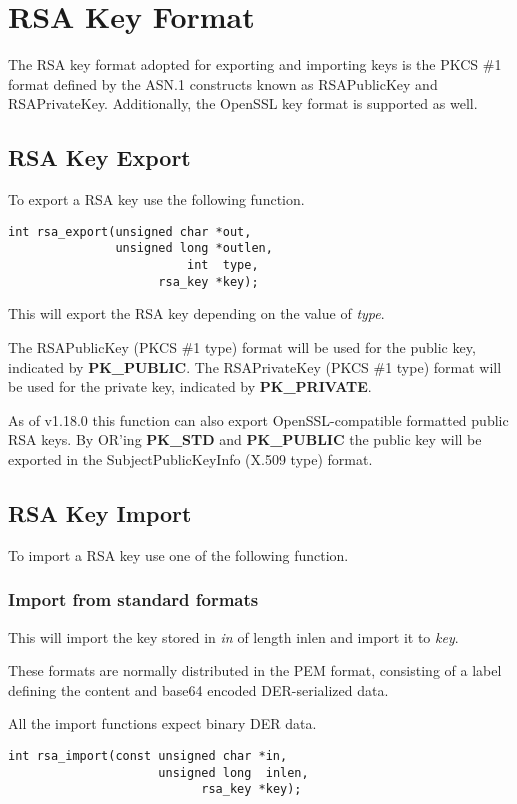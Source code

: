 \documentclass[synpaper]{book}
\newcommand{\mysection}[1]    %
	{                   %
	\section{#1}
   \markboth{\textsf{www.libtom.net}}{\thesection ~ {#1}}
	}
\begin{document}
\mysection{RSA Key Format}

The RSA key format adopted for exporting and importing keys is the PKCS \#1 format defined by the ASN.1 constructs known as
RSAPublicKey and RSAPrivateKey.  Additionally, the OpenSSL key format is supported as well.

\subsection{RSA Key Export}
To export a RSA key use the following function.

\begin{verbatim}
int rsa_export(unsigned char *out,
               unsigned long *outlen,
                         int  type,
                     rsa_key *key);
\end{verbatim}

This will export the RSA key depending on the value of \textit{type}.

The RSAPublicKey (PKCS \#1 type) format will be used for the public key,
indicated by \textbf{PK\_PUBLIC}.
The RSAPrivateKey (PKCS \#1 type) format will be used for the private key,
indicated by \textbf{PK\_PRIVATE}.

As of v1.18.0 this function can also export OpenSSL-compatible formatted public RSA keys.
By OR'ing \textbf{PK\_STD} and \textbf{PK\_PUBLIC} the public key will be exported
in the SubjectPublicKeyInfo (X.509 type) format.

\subsection{RSA Key Import}
To import a RSA key use one of the following function.

\subsubsection{Import from standard formats}

This will import the key stored in \textit{in} of length inlen and import it to \textit{key}.

These formats are normally distributed in the PEM format, consisting of a label defining the content and base64 encoded DER-serialized data.

All the import functions expect binary DER data.

\begin{verbatim}
int rsa_import(const unsigned char *in,
                     unsigned long  inlen,
                           rsa_key *key);
\end{verbatim}
\end{document}
